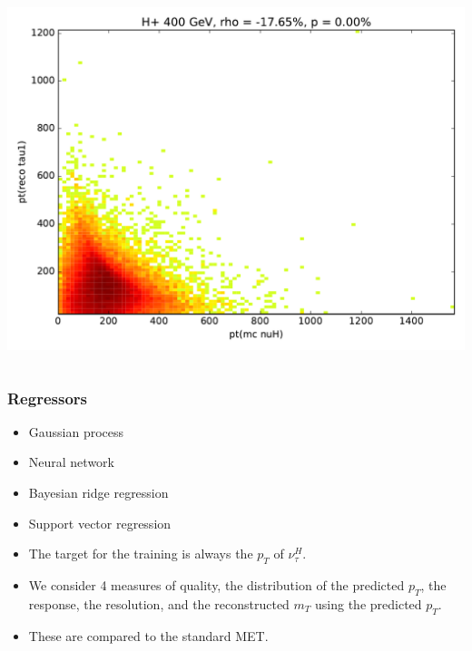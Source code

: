 \documentclass[9pt, lualatex]{beamer}
\begin{document}
\begin{frame}
\begin{columns}
        \includegraphics[width=\textwidth]{correlations/hp400_pt_reco_tau1.pdf}
    \end{columns}

\end{frame}

\begin{frame}
    \frametitle{Regressors}
    \begin{itemize}
    \item Gaussian process
    \item Neural network
    \item Bayesian ridge regression
    \item Support vector regression
    \end{itemize}
    \vfill
    \begin{itemize}
        \item The target for the training is always the $p_T$ of $\nu_\tau^H$.
        \item We consider 4 measures of quality, the distribution of the predicted $p_T$, the response, the resolution,
            and the reconstructed $m_T$ using the predicted $p_T$.
        \item These are compared to the standard MET.
    \end{itemize}
\end{frame}
\end{document}
